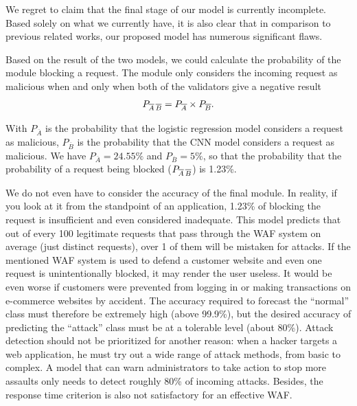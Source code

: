 We regret to claim that the final stage of our model is currently incomplete. Based solely on what we currently have, it is also clear that in comparison to previous related works, our proposed model has numerous significant flaws.


Based on the result of the two models, we could calculate the probability of the module blocking a request. The module only considers the incoming request as malicious when and only when both of the validators give a negative result
\begin{align*}
	P_{\overline{A}\hspace{0.05cm}\overline{B}} = P_{\overline{A}} \times P_{\overline{B}}.
\end{align*}

With $P_{\overline{A}}$ is the probability that the logistic regression model considers a request as malicious, $P_{\overline{B}}$ is the probability that the CNN model considers a request as malicious. We have $P_{\overline{A}} = 24.55\%$ and $P_{\overline{B}} = 5\%$, so that the probability that the probability of a request being blocked ($P_{\overline{A}\hspace{0.05cm}\overline{B}}$) is 1.23\%. 

We do not even have to consider the accuracy of the final module. In reality, if you look at it from the standpoint of an application, 1.23\% of blocking the request is insufficient and even considered inadequate. This model predicts that out of every 100 legitimate requests that pass through the WAF system on average (just distinct requests), over 1 of them will be mistaken for attacks. If the mentioned WAF system is used to defend a customer website and even one request is unintentionally blocked, it may render the user useless. It would be even worse if customers were prevented from logging in or making transactions on e-commerce websites by accident. The accuracy required to forecast the ``normal'' class must therefore be extremely high (above 99.9\%), but the desired accuracy of predicting the ``attack'' class must be at a tolerable level (about 80\%). Attack detection should not be prioritized for another reason: when a hacker targets a web application, he must try out a wide range of attack methods, from basic to complex. A model that can warn administrators to take action to stop more assaults only needs to detect roughly 80\% of incoming attacks. Besides, the response time criterion is also not satisfactory for an effective WAF. 

